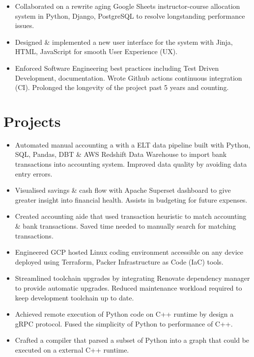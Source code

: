 \begin{itemize}
  \item Collaborated on a rewrite aging Google Sheets instructor-course allocation system in Python, Django, PostgreSQL to 
    resolve longstanding performance issues. 
  \item Designed \& implemented a new user interface 
    for the system with Jinja, HTML, JavaScript for smooth User Experience (UX).
  \item Enforced Software Engineering best practices including Test Driven Development,
    documentation. Wrote Github actions continuous integration (CI). 
    Prolonged the longevity of the project past 5 years and counting.
\end{itemize}

\section{Projects}

\begin{itemize}
  \item Automated manual accounting a with a ELT data pipeline built with Python, SQL, Pandas, DBT \& AWS Redshift Data Warehouse to import bank transactions into accounting system. Improved data quality by avoiding data entry errors.
  \item Visualised savings \& cash flow with Apache Superset dashboard to give greater insight into financial health. Assists in budgeting for future expenses.
  \item Created accounting aide that used transaction heuristic to match accounting \& bank transactions. Saved time needed to manually search for matching transactions.
\end{itemize}

\begin{itemize}
  \item Engineered GCP hosted Linux coding environment accessible on any device deployed using Terraform,
    Packer Infrastructure as Code (IaC) tools.
  \item Streamlined toolchain upgrades by integrating Renovate dependency manager to provide automatic upgrades. Reduced maintenance workload required to keep development toolchain up to date.
\end{itemize}
\begin{itemize}
\item Achieved remote execution of Python code on C++ runtime by design a gRPC protocol. Fused the simplicity of Python to performance of C++.
\item Crafted a compiler that parsed a subset of Python into a graph that could be executed on a external C++ runtime.
\end{itemize}
  
